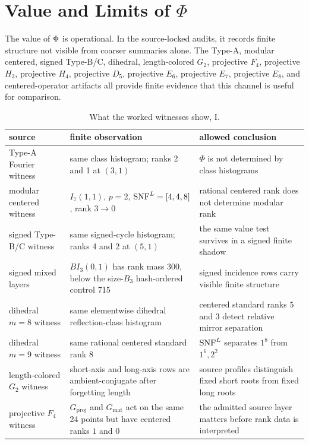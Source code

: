 \section{Value and Limits of \texorpdfstring{\(\Phi\)}{Phi}}

The value of \(\Phi\) is operational.  In the source-locked audits, it records finite structure not visible from coarser summaries alone.  The Type-A, modular centered, signed Type-B/C, dihedral, length-colored \(G_2\), projective \(F_4\), projective \(H_3\), projective \(H_4\), projective \(D_5\), projective \(E_6\), projective \(E_7\), projective \(E_8\), and centered-operator artifacts all provide finite evidence that this channel is useful for comparison.

\begin{table}[!htbp]
\centering
\scriptsize
\setlength{\tabcolsep}{3pt}
\renewcommand{\arraystretch}{0.86}
\caption{What the worked witnesses show, I.}
\label{tab:phi-payoff}
\begin{tabular}{@{}L{0.24\textwidth}L{0.31\textwidth}L{0.35\textwidth}@{}}
\toprule
source & finite observation & allowed conclusion \\
\midrule
Type-A Fourier witness & same class histogram; ranks 2 and 1 at \((3,1)\) & \(\Phi\) is not determined by class histograms \\
modular centered witness & \(I_7(1,1)\), \(p=2\), \(\operatorname{SNF}^{L}=[4,4,8]\), rank \(3\to0\) & rational centered rank does not determine modular rank \\
signed Type-B/C witness & same signed-cycle histogram; ranks 4 and 2 at \((5,1)\) & the same value test survives in a signed finite shadow \\
signed mixed layers & \(BI_3(0,1)\) has rank mass 300, below the size-\(B_3\) hash-ordered control 715 & signed incidence rows carry visible finite structure \\
dihedral \(m=8\) witness & same elementwise dihedral reflection-class histogram & centered standard ranks \(5\) and \(3\) detect relative mirror separation \\
dihedral \(m=9\) witness & same rational centered standard rank \(8\) & \(\operatorname{SNF}^{L}\) separates \(1^8\) from \(1^6,2^2\) \\
length-colored \(G_2\) witness & short-axis and long-axis rows are ambient-conjugate after forgetting length & source profiles distinguish fixed short roots from fixed long roots \\
projective \(F_4\) witness & \(G_{\mathrm{proj}}\) and \(G_{\mathrm{mat}}\) act on the same 24 points but have centered ranks \(1\) and \(0\) & the admitted source layer matters before rank data is interpreted \\
\bottomrule
\end{tabular}
\end{table}

